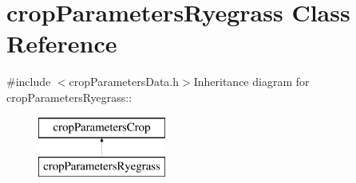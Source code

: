 \hypertarget{classcrop_parameters_ryegrass}{
\section{cropParametersRyegrass Class Reference}
\label{classcrop_parameters_ryegrass}
}


{\ttfamily \#include $<$cropParametersData.h$>$}Inheritance diagram for cropParametersRyegrass::\begin{figure}[H]
\begin{center}
\leavevmode
\includegraphics[height=2cm]{classcrop_parameters_ryegrass}
\end{center}
\end{figure}
